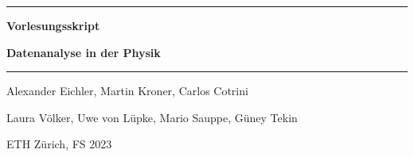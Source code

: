 \documentclass[a4paper, twoside, 11pt]{book}
\numberwithin{equation}{section} %
\numberwithin{table}{section}
\begin{document}
\hypersetup{pageanchor=false}
\begin{titlepage}
	
	
	\centering

	\hrule height 1.5pt
	\vspace{10pt}
	{\Large \bfseries Vorlesungsskript \par}
	\vspace{10pt}
	{\huge\bfseries Datenanalyse in der Physik  \par}
	\vspace{10pt}
	\hrule height 1.5pt
	
	
	\vspace{15mm}
	
	\begin{center}
		{\Large Alexander Eichler, Martin Kroner, Carlos Cotrini \par 
         \Large Laura V\"olker, Uwe von L\"upke, Mario Sauppe, G\"uney Tekin \par }
		\vspace{15mm}
      
	
		
		
		\vfill
		{\large ETH Zürich, FS 2023\par}
	\end{center}
\end{titlepage}

\hypersetup{pageanchor=true}

\tableofcontents

\newpage
{}









\renewcommand*{\arraystretch}{1.2}%
\end{document}
